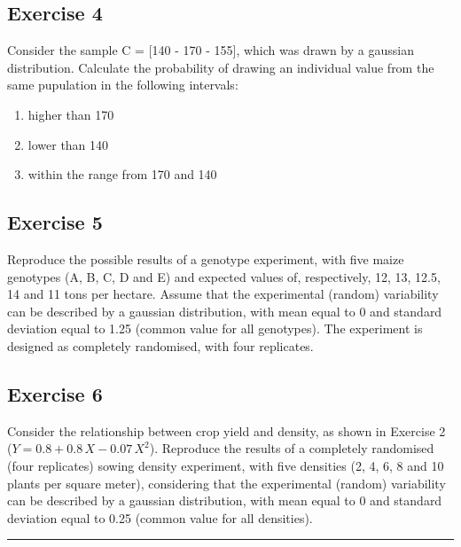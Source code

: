 \documentclass[a4paper,12pt,oneside]{book}
\providecommand{\tightlist}{%
  \setlength{\itemsep}{0pt}\setlength{\parskip}{0pt}}
\begin{document}
\hypertarget{exercise-4}{%
\subsection{Exercise 4}\label{exercise-4}}

Consider the sample C = {[}140 - 170 - 155{]}, which was drawn by a gaussian distribution. Calculate the probability of drawing an individual value from the same pupulation in the following intervals:

\begin{enumerate}
\def\labelenumi{\arabic{enumi}.}
\tightlist
\item
  higher than 170
\item
  lower than 140
\item
  within the range from 170 and 140
\end{enumerate}

\hypertarget{exercise-5}{%
\subsection{Exercise 5}\label{exercise-5}}

Reproduce the possible results of a genotype experiment, with five maize genotypes (A, B, C, D and E) and expected values of, respectively, 12, 13, 12.5, 14 and 11 tons per hectare. Assume that the experimental (random) variability can be described by a gaussian distribution, with mean equal to 0 and standard deviation equal to 1.25 (common value for all genotypes). The experiment is designed as completely randomised, with four replicates.

\hypertarget{exercise-6}{%
\subsection{Exercise 6}\label{exercise-6}}

Consider the relationship between crop yield and density, as shown in Exercise 2 (\(Y = 0.8 + 0.8 \, X - 0.07 \, X^2\)). Reproduce the results of a completely randomised (four replicates) sowing density experiment, with five densities (2, 4, 6, 8 and 10 plants per square meter), considering that the experimental (random) variability can be described by a gaussian distribution, with mean equal to 0 and standard deviation equal to 0.25 (common value for all densities).

\begin{center}\rule{0.5\linewidth}{0.5pt}\end{center}
\end{document}
